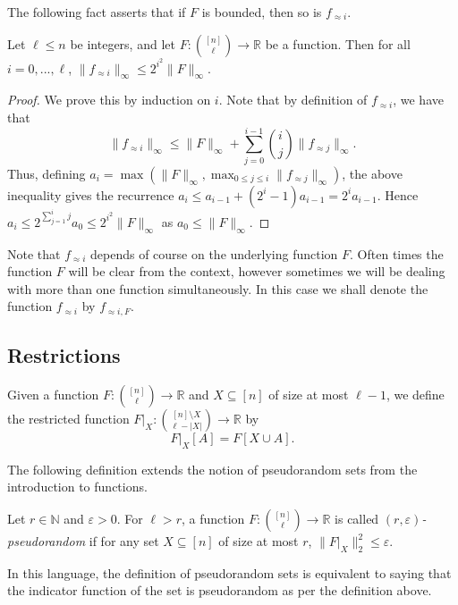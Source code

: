 \documentclass{toc}
\newcommand\card[1]{\left| {#1} \right|}
\newcommand\norm[1]{\| #1 \|}
\newcommand\eps{\varepsilon}
\renewcommand\leq{\leqslant}
\newcommand\approxlvlfn[2]{{#1}_{\approx{#2}}}
\begin{document}
The following fact asserts that if $F$ is bounded, then so is $\approxlvlfn{f}{i}$.
\begin{fact}\label{fact:bdd}
Let $\ell\leq n$ be integers, and let
$F\colon {[n]\choose \ell}\to\mathbb{R}$ be a function.
Then for all $i=0,...,\ell$, $\norm{\approxlvlfn{f}{i}}_{\infty} \leq 2^{i^2}\norm{F}_{\infty}$.
\end{fact}
\begin{proof}
  We prove this by induction on $i$. Note that by definition of $\approxlvlfn{f}{i}$, we have that
  \[
  \norm{\approxlvlfn{f}{i}}_{\infty}
  \leq \norm{F}_{\infty} + \sum\limits_{j=0}^{i-1}\binom{i}{j}\norm{\approxlvlfn{f}{j}}_{\infty}.
  \]
  Thus, defining $a_i = \max(\norm{F}_{\infty}, \max_{0\leq j\leq i} \norm{\approxlvlfn{f}{j}}_{\infty})$, the above inequality gives %
  the recurrence $a_i\leq a_{i-1} + (2^{i}-1) a_{i-1} = 2^{i} a_{i-1}$. Hence $a_i\leq 2^{\sum\limits_{j=1}^{i} j} a_0 \leq 2^{i^2}\norm{F}_{\infty}$
  as $a_0 \leq \norm{F}_{\infty}$.
\end{proof}



Note that $\approxlvlfn{f}{i}$ depends of course on the underlying function $F$.
Often times the function $F$
will be clear from the context, however sometimes we will be dealing with more than one function
simultaneously. In this case we shall denote the function $\approxlvlfn{f}{i}$ by $\approxlvlfn{f}{i, F}$.


\subsection{Restrictions}
Given a function $F\colon {[n] \choose \ell}\to \mathbb{R}$ and $X\subseteq [n]$ of size at most
$\ell-1$, we define the restricted function $F|_X \colon {[n]\setminus X\choose \ell-\card{X}} \to\mathbb{R}$ by
\[
F|_X[A] = F[X\cup A].
\]

The following definition extends the notion of pseudorandom sets from the introduction to functions.
\begin{definition}
  Let $r\in\mathbb{N}$ and $\eps>0$. For $\ell>r$, a function $F\colon {[n] \choose \ell} \to\mathbb{R}$ is called \emph{$(r,\eps)$-pseudorandom} %
  if for any set $X\subseteq[n]$ of size at most $r$, $\norm{F|_X}_2^2 \leq \eps$.
\end{definition}
In this language, the definition of pseudorandom sets is equivalent to saying that the indicator function of the set is pseudorandom as per
the definition above.
\end{document}
